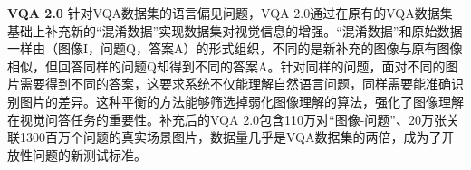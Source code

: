 

\textbf{VQA 2.0}\qquad
针对VQA数据集的语言偏见问题，VQA 2.0通过在原有的VQA数据集基础上补充新的“混淆数据”实现数据集对视觉信息的增强。“混淆数据”和原始数据一样由（图像I，问题Q，答案A）的形式组织，不同的是新补充的图像与原有图像相似，但回答同样的问题Q却得到不同的答案A。针对同样的问题，面对不同的图片需要得到不同的答案，这要求系统不仅能理解自然语言问题，同样需要能准确识别图片的差异。这种平衡的方法能够筛选掉弱化图像理解的算法，强化了图像理解在视觉问答任务的重要性。补充后的VQA 2.0包含110万对“图像-问题”、20万张关联1300百万个问题的真实场景图片，数据量几乎是VQA数据集的两倍，成为了开放性问题的新测试标准。

